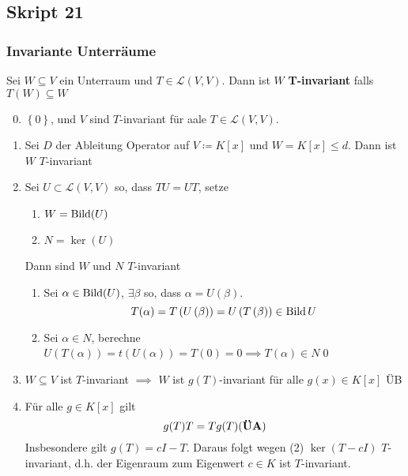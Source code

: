 \subsection{Skript 21}
\setcounter{subsubsection}{11}
\subsubsection{Invariante Unterräume}

\begin{subdefinition}
	Sei $ W \subseteq V $ ein Unterraum und $ T \in \mathcal{L} (V, V) $.
	Dann ist $ W $ \textbf{T-invariant} falls $ T(W) \subseteq W $
\end{subdefinition}

\begin{subexample}
	\begin{enumerate}[label=(\arabic*)]
		\setcounter{enumi}{-1}
		\item $ \left\{ 0 \right\}  $, und $ V $ sind $ T $-invariant für aale $ T \in \mathcal{L} (V, V) $.
		\item Sei $ D $ der Ableitung Operator auf $ V \coloneqq K[x] $ und $ W = K[x] \leq d $.
			Dann ist $ W $ $ T $-invariant
		\item Sei $ U \subset \mathcal{L} (V, V) $ so, dass $ TU = UT $, setze
			\begin{enumerate}[label=(\alph*)]
				\item $ W = \operatorname{Bild} (U) $ 
				\item $ N = \ker (U) $
			\end{enumerate}
			Dann sind $ W $ und $ N $ $ T $-invariant
			\begin{subproof*}
				\begin{enumerate}[label=(\alph*)]
					\item Sei $ \alpha \in \operatorname{Bild} (U) $, $ \exists \beta $ so, dass $ \alpha = U(\beta) $.
						\[
							T(\alpha) = T\left( U\left( \beta \right)  \right) = U\left( T\left( \beta \right)  \right) \in \operatorname{Bild} U
						\]
					\item Sei $ \alpha \in N $, berechne $ U\left( T\left( \alpha \right)  \right) = t\left( U\left( \alpha \right)  \right) = T(0) = 0 \implies T(\alpha) \in N $\qed
				\end{enumerate}
			\end{subproof*}
		\item $ W \subseteq V $ ist $ T $-invariant $ \implies  $ $ W $ ist $ g(T) $-invariant für alle $ g(x) \in K[x] $ ÜB
		\item Für alle $ g \in K[x] $ gilt
			\[
				g(T) T = T g(T) \text{(\textbf{ÜA})}
			\]
			Insbesondere gilt $ g(T) = cI - T $.
			Daraus folgt wegen (2) $ \ker (T - cI) $ $ T $-invariant,
			d.h. der Eigenraum zum Eigenwert $ c \in K $ ist $ T $-invariant.
	\end{enumerate}
\end{subexample}

